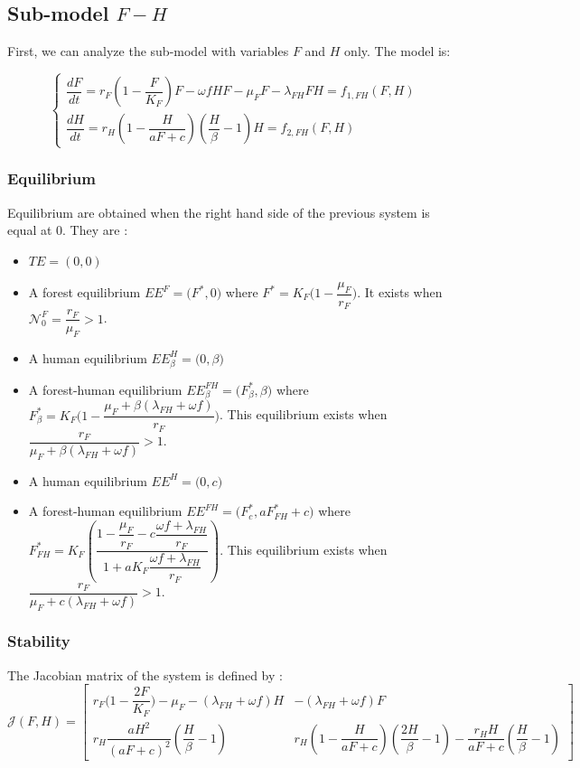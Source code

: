 \documentclass{article}
\newcommand{\lf}{\lambda_{FH}}
\newcommand{\NF}{\mathcal{N}_0^F}
\begin{document}
\subsection{Sub-model $F-H$}
First, we can analyze the sub-model with variables $F$ and $H$ only. The model is:

\begin{equation}    
\left\{ \begin{array}{l}
\dfrac{dF}{dt}=r_{F}\left(1-\dfrac{F}{K_{F}}\right)F-\omega f H F - \mu_F F -\lf F H = f_{1, FH} (F,H) \\
\dfrac{dH}{dt}=r_H \left(1-\dfrac{H}{aF + c} \right)  (\dfrac{H}{\beta} - 1) H = f_{2,FH}(F,H)
\end{array}\right.
\label{model:submodelFH}
\end{equation}

\subsubsection{Equilibrium}
Equilibrium are obtained when the right hand side of the previous system is equal at 0. They are :
\begin{itemize}
\item $TE = (0,0)$
\item A forest equilibrium $EE^F = \Big(F^*, 0 \Big) $ where $F^* = K_F \Big(1 - \dfrac{\mu_F}{r_F}\Big)$. It exists when $\NF = \dfrac{r_F}{\mu_F} > 1$.
\item A human equilibrium $EE^H_\beta = \Big(0,\beta \Big)$
\item A forest-human equilibrium $EE^{FH}_\beta = \Big(F^*_\beta, \beta\Big)$ where $F^*_\beta = K_F \Big(1-\dfrac{\mu_F + \beta(\lf + \omega f)}{r_F} \Big)$.
This equilibrium exists when $\dfrac{r_F}{\mu_F + \beta(\lf + \omega f)} > 1$.
\item A human equilibrium $EE^H = \Big(0,c \Big)$
\item A forest-human equilibrium $EE^{FH} = \Big(F^*_{c}, aF^*_{FH} + c \Big)$ where $F^*_{FH} = K_F \left( \dfrac{1 - \dfrac{\mu_F}{r_F} - c \dfrac{\omega f + \lf}{r_F}}{1 + a K_F \dfrac{\omega f + \lf}{r_F}} \right)$. This equilibrium exists when $\dfrac{r_F}{\mu_F + c(\lf + \omega f)} > 1$.
\end{itemize}

\subsubsection{Stability}
The Jacobian matrix of the system is defined by :
\begin{equation}
\mathcal{J}(F,H) =  \begin{bmatrix}
r_F \Big(1-\dfrac{2F}{K_F} \Big) - \mu_F - (\lf + \omega f)H & -(\lf + \omega f)F \\
r_H \dfrac{aH^2}{(aF+c)^2} (\dfrac{H}{\beta}-1) & r_H(1-\dfrac{H}{aF+c})(\dfrac{2H}{\beta}-1) - \dfrac{r_H H}{aF+c}(\dfrac{H}{\beta}-1)
\end{bmatrix}
\label{stab:jacobianFH}
\end{equation}
\end{document}
